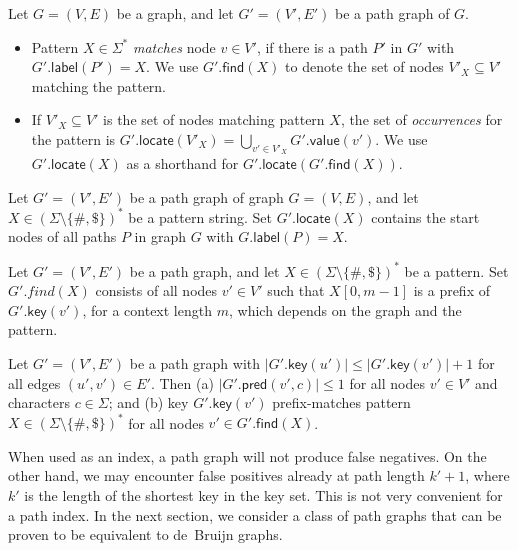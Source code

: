 \documentclass[a4paper,UKenglish]{lipics-v2016}
\newcommand{\set}[1]{\ensuremath{\{ #1 \}}}
\newcommand{\abs}[1]{\ensuremath{\lvert #1 \rvert}}
\newcommand{\find}{\ensuremath{\mathsf{find}}}
\newcommand{\locate}{\ensuremath{\mathsf{locate}}}
\newcommand{\glabel}{\ensuremath{\mathsf{label}}}
\newcommand{\gpred}{\ensuremath{\mathsf{pred}}}
\newcommand{\gkey}{\ensuremath{\mathsf{key}}}
\newcommand{\gvalue}{\ensuremath{\mathsf{value}}}
\newcommand{\patternset}{\ensuremath{(\Sigma \setminus \set{\#, \$})^{\ast}}}
\begin{document}
\begin{definition}
Let $G = (V, E)$ be a graph, and let $G' = (V', E')$ be a path graph of $G$.
\begin{itemize}
\item Pattern $X \in \Sigma^{\ast}$ \emph{matches} node $v \in V'$, if there is a path $P'$ in $G'$ with $G'.\glabel(P') = X$. We use $G'.\find(X)$ to denote the set of nodes $V'_{X} \subseteq V'$ matching the pattern.
\item If $V'_{X} \subseteq V'$ is the set of nodes matching pattern $X$, the set of \emph{occurrences} for the pattern is $G'.\locate(V'_{X}) = \bigcup_{v' \in V'_{X}} G'.\gvalue(v')$. We use $G'.\locate(X)$ as a shorthand for $G'.\locate(G'.\find(X))$.
\end{itemize}
\end{definition}

\begin{lemma}\label{lemma:pg-fn}
Let $G' = (V', E')$ be a path graph of graph $G = (V, E)$, and let $X \in \patternset$ be a pattern string. Set $G'.\locate(X)$ contains the start nodes of all paths $P$ in graph $G$ with $G.\glabel(P) = X$.
\end{lemma}

\begin{lemma}\label{lemma:pg-context}
Let $G' = (V', E')$ be a path graph, and let $X \in \patternset$ be a pattern. Set $G'.find(X)$ consists of all nodes $v' \in V'$ such that $X[0, m-1]$ is a prefix of $G'.\gkey(v')$, for a context length $m$, which depends on the graph and the pattern.
\end{lemma}

\begin{lemma}\label{lemma:pg-keys}
Let $G' = (V', E')$ be a path graph with $\abs{G'.\gkey(u')} \le \abs{G'.\gkey(v')}+1$ for all edges $(u', v') \in E'$. Then
(a) $\abs{G'.\gpred(v', c)} \le 1$ for all nodes $v' \in V'$ and characters $c \in \Sigma$; and
(b) key $G'.\gkey(v')$ prefix-matches pattern $X \in \patternset$ for all nodes $v' \in G'.\find(X)$.
\end{lemma}

When used as an index, a path graph will not produce false negatives. On the other hand, we may encounter false positives already at path length $k'+1$, where $k'$ is the length of the shortest key in the key set. This is not very convenient for a path index. In the next section, we consider a class of path graphs that can be proven to be equivalent to de~Bruijn graphs.
\end{document}
